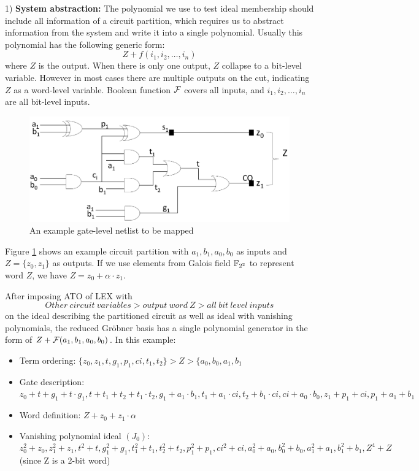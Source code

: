 1) {\bf System abstraction:}
The polynomial we use to test ideal membership should include all information of a circuit partition,
which requires us to abstract information from the system and write it into a single polynomial.
Usually this polynomial has the following generic form:
$$Z + f(i_1,i_2,\dots,i_n)$$
where $Z$ is the output. When there is only one output, $Z$ collapse to a bit-level variable. However in most
cases there are multiple outputs on the cut, indicating $Z$ as a word-level variable. Boolean function ${\mathcal{F}}$ covers
all inputs, and $i_1,i_2,\dots,i_n$ are all bit-level inputs.

\begin{figure}[h]
	\begin{center}
	\includegraphics[width=\textwidth]{newfig/tobemapped.pdf}
	\end{center}
	\caption{An example gate-level netlist to be mapped}
	\label{fig:tobemapped}
\end{figure}

Figure \ref{fig:tobemapped} shows an example circuit partition with $a_1,b_1,a_0,b_0$ as inputs and
$Z = \{z_0,z_1\}$ as outputs. If we use elements from Galois field ${\mathbb{F}}_{2^2}$ to represent word $Z$,
we have $Z = z_0 + \alpha\cdot z_1$.

After imposing ATO of LEX with
$$Other\ circuit\ variables > output\ word\ Z > all\ bit\ level\ inputs$$
on the ideal describing the partitioned circuit as well as ideal with vanishing polynomials,
the reduced Gr\"obner basis has a single polynomial generator in the form of $Z + {\mathcal{F}}(a_1,b_1,a_0,b_0)$.
In this example:

\begin{itemize}
\item Term ordering: $\{z_0,z_1,t,g_1,p_1,ci,t_1,t_2\}>Z>\{a_0,b_0,a_1,b_1$
\item Gate description: $z_0+t+g_1+t\cdot g_1, t+t_1+t_2+t_1\cdot t_2, g_1+a_1\cdot b_1,
			t_1+a_1\cdot ci, t_2+b_1\cdot ci, ci+a_0\cdot b_0, z_1+p_1+ci, p_1+a_1+b_1$
\item Word definition: $Z+z_0+z_1\cdot \alpha$
\item Vanishing polynomial ideal $(J_0)$: $z_0^2+z_0, z_1^2+z_1, t^2+t, g_1^2+g_1, t_1^2+t_1, t_2^2+t_2, p_1^2+p_1, ci^2+ci,
			a_0^2+a_0, b_0^2+b_0, a_1^2+a_1, b_1^2+b_1, Z^4+Z$(since Z is a 2-bit word)
\end{itemize}

